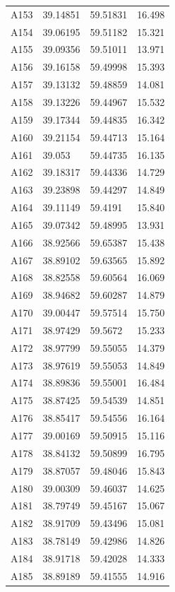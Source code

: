 \documentclass[useAMS,usenatbib]{mn2e}
\begin{document}
\begin{table}
\begin{tabular}{lllc}
	A153 & 39.14851 & 59.51831 & 16.498 \\
	A154 & 39.06195 & 59.51182 & 15.321 \\
	A155 & 39.09356 & 59.51011 & 13.971 \\
	A156 & 39.16158 & 59.49998 & 15.393 \\
	A157 & 39.13132 & 59.48859 & 14.081 \\
	A158 & 39.13226 & 59.44967 & 15.532 \\
	A159 & 39.17344 & 59.44835 & 16.342 \\
	A160 & 39.21154 & 59.44713 & 15.164 \\
	A161 & 39.053 & 59.44735 & 16.135 \\
	A162 & 39.18317 & 59.44336 & 14.729 \\
	A163 & 39.23898 & 59.44297 & 14.849 \\
	A164 & 39.11149 & 59.4191 & 15.840 \\
	A165 & 39.07342 & 59.48995 & 13.931 \\
	A166 & 38.92566 & 59.65387 & 15.438 \\
	A167 & 38.89102 & 59.63565 & 15.892 \\
	A168 & 38.82558 & 59.60564 & 16.069 \\
	A169 & 38.94682 & 59.60287 & 14.879 \\
	A170 & 39.00447 & 59.57514 & 15.750 \\
	A171 & 38.97429 & 59.5672 & 15.233 \\
	A172 & 38.97799 & 59.55055 & 14.379 \\
	A173 & 38.97619 & 59.55053 & 14.849 \\
	A174 & 38.89836 & 59.55001 & 16.484 \\
	A175 & 38.87425 & 59.54539 & 14.851 \\
	A176 & 38.85417 & 59.54556 & 16.164 \\
	A177 & 39.00169 & 59.50915 & 15.116 \\
	A178 & 38.84132 & 59.50899 & 16.795 \\
	A179 & 38.87057 & 59.48046 & 15.843 \\
	A180 & 39.00309 & 59.46037 & 14.625 \\
	A181 & 38.79749 & 59.45167 & 15.067 \\
	A182 & 38.91709 & 59.43496 & 15.081 \\
	A183 & 38.78149 & 59.42986 & 14.826 \\
	A184 & 38.91718 & 59.42028 & 14.333 \\
	A185 & 38.89189 & 59.41555 & 14.916 \\

\end{tabular}
\end{table}
\end{document}
